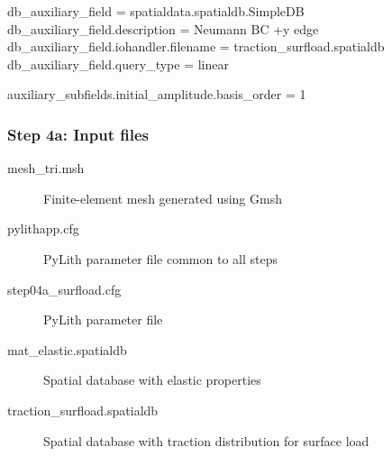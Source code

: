 \documentclass[aspectratio=169]{beamer}
\begin{document}
\begin{frame}[t,fragile]
\begin{minipage}[t]{0.67\textwidth}
\begin{onlyenv}
\begin{cfgcode}
        db_auxiliary_field = spatialdata.spatialdb.SimpleDB
        db_auxiliary_field.description = Neumann BC +y edge
        db_auxiliary_field.iohandler.filename = traction_surfload.spatialdb
        db_auxiliary_field.query_type = linear

        auxiliary_subfields.initial_amplitude.basis_order = 1
      \end{cfgcode}
    \end{onlyenv}
  \end{minipage}

  
\end{frame}


\begin{frame}
  \frametitle{Step 4a: Input files}
  \summary{}

  \begin{description}
  \item[mesh\_tri.msh] Finite-element mesh generated using Gmsh
  \item[pylithapp.cfg] PyLith parameter file common to all steps
  \item[step04a\_surfload.cfg] PyLith parameter file
  \item[mat\_elastic.spatialdb] Spatial database with elastic properties
  \item[traction\_surfload.spatialdb] Spatial database with traction distribution for surface load
  \end{description}

\end{frame}
\end{document}
